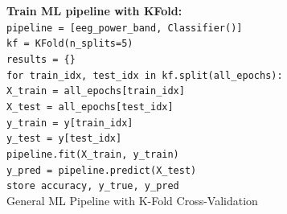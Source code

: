 \begin{algorithm}
		\vspace{0.3cm}
		\textbf{Train ML pipeline with KFold:} \\
		\texttt{pipeline = [eeg\_power\_band, Classifier()]} \\
		\texttt{kf = KFold(n\_splits=5)} \\
		\texttt{results = \{\}} \\
		\texttt{for train\_idx, test\_idx in kf.split(all\_epochs):} \\
		\hspace*{0.5cm}\texttt{X\_train = all\_epochs[train\_idx]} \\
		\hspace*{0.5cm}\texttt{X\_test = all\_epochs[test\_idx]} \\
		\hspace*{0.5cm}\texttt{y\_train = y[train\_idx]} \\
		\hspace*{0.5cm}\texttt{y\_test = y[test\_idx]} \\
		\hspace*{0.5cm}\texttt{pipeline.fit(X\_train, y\_train)} \\
		\hspace*{0.5cm}\texttt{y\_pred = pipeline.predict(X\_test)} \\
		\hspace*{0.5cm}\texttt{store accuracy, y\_true, y\_pred} \\
		
	 
		
		\caption{General ML Pipeline with K-Fold Cross-Validation}
	\end{algorithm}
	
	
	
	
	
	
 
 
 
 
 
 
 
 
 
 
 
 
 
 \DontPrintSemicolon
 
